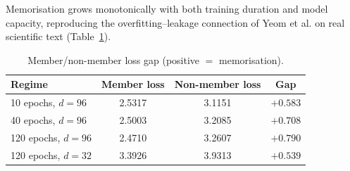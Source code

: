 \documentclass[11pt,a4paper]{article}
\theoremstyle{plain}
\theoremstyle{definition}
\begin{document}
Memorisation grows monotonically with both training duration and model
capacity, reproducing the overfitting--leakage connection of Yeom et al. on
real scientific text (Table~\ref{tab:mia}).

\begin{table}[h]
\centering
\caption{Member/non-member loss gap (positive $=$ memorisation).}
\begin{tabular}{lccc}
\toprule
\textbf{Regime} & \textbf{Member loss} & \textbf{Non-member loss} & \textbf{Gap} \\
\midrule
10 epochs, $d=96$   & 2.5317 & 3.1151 & $+0.583$ \\
40 epochs, $d=96$   & 2.5003 & 3.2085 & $+0.708$ \\
120 epochs, $d=96$  & 2.4710 & 3.2607 & $\mathbf{+0.790}$ \\
\midrule
120 epochs, $d=32$  & 3.3926 & 3.9313 & $+0.539$ \\
\bottomrule
\end{tabular}
\label{tab:mia}
\end{table}
\end{document}
